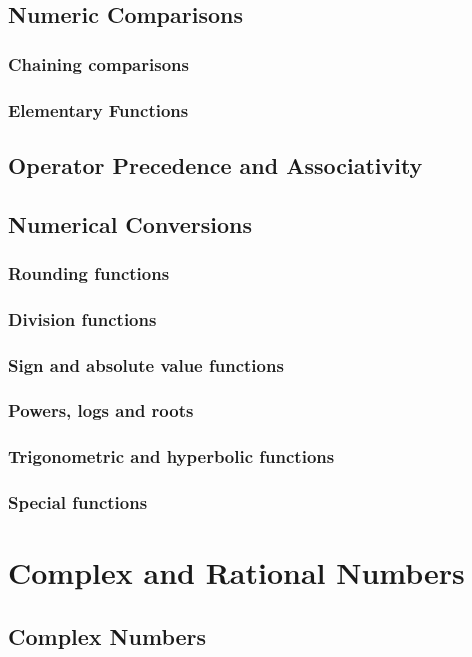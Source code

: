     \section{Numeric Comparisons}
    \subsection{Chaining comparisons}
    \subsection{Elementary Functions}
    \section{Operator Precedence and Associativity}
    \section{Numerical Conversions}
    \subsection{Rounding functions}
    \subsection{Division functions}
    \subsection{Sign and absolute value functions}
    \subsection{Powers, logs and roots}
    \subsection{Trigonometric and hyperbolic functions}
    \subsection{Special functions}
  \chapter{Complex and Rational Numbers}
    \section{Complex Numbers}
